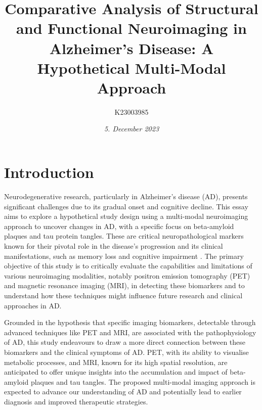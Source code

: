 \documentclass[10pt]{article}
\title{\textbf{Comparative Analysis of Structural and Functional Neuroimaging in Alzheimer’s Disease: }A Hypothetical Multi-Modal Approach}
\author[ ]{K23003985}
\date{\textit{5. December 2023}}
\begin{document}

\maketitle

\doublespacing

\begin{sloppypar} %





  \section{Introduction}
  \label{sec:introduction}

  Neurodegenerative research, particularly in Alzheimer’s disease (AD), presents significant challenges due to its gradual onset and cognitive decline. This essay aims to explore a hypothetical study design using a multi-modal neuroimaging approach to uncover changes in AD, with a specific focus on beta-amyloid plaques and tau protein tangles. These are critical neuropathological markers known for their pivotal role in the disease’s progression and its clinical manifestations, such as memory loss and cognitive impairment \citep{heneka_neuroinflammation_2015,marttinen_molecular_2018}. The primary objective of this study is to critically evaluate the capabilities and limitations of various neuroimaging modalities, notably positron emission tomography (PET) and magnetic resonance imaging (MRI), in detecting these biomarkers and to understand how these techniques might influence future research and clinical approaches in AD.

  Grounded in the hypothesis that specific imaging biomarkers, detectable through advanced techniques like PET and MRI, are associated with the pathophysiology of AD, this study endeavours to draw a more direct connection between these biomarkers and the clinical symptoms of AD. PET, with its ability to visualise metabolic processes, and MRI, known for its high spatial resolution, are anticipated to offer unique insights into the accumulation and impact of beta-amyloid plaques and tau tangles. The proposed multi-modal imaging approach is expected to advance our understanding of AD and potentially lead to earlier diagnosis and improved therapeutic strategies.


\end{sloppypar}
\end{document}
